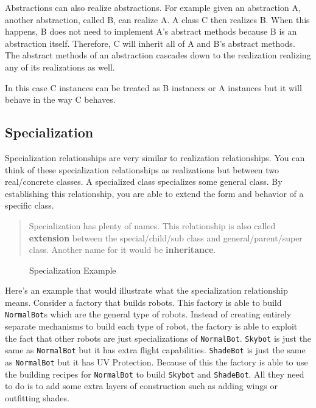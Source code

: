 Abstractions can also realize abstractions. For example given an
abstraction A, another abstraction, called B, can realize A. A class C
then realizes B. When this happens, B does not need to implement A's
abstract methods because B is an abstraction itself. Therefore, C will
inherit all of A and B's abstract methods. The abstract methods of an
abstraction cascades down to the realization realizing any of its
realizations as well.

In this case C instances can be treated as B instances or A instances
but it will behave in the way C behaves.

\subsection{Specialization}\label{class-relationships.md__specialization}

Specialization relationships are very similar to realization
relationships. You can think of these specialization relationships as
realizations but between two real/concrete classes. A specialized class
specializes some general class. By establishing this relationship, you
are able to extend the form and behavior of a specific class.

\begin{quote}
Specialization has plenty of names. This relationship is also called
\textbf{extension} between the special/child/sub class and
general/parent/super class. Another name for it would be
\textbf{inheritance}.
\end{quote}

\begin{figure}
\centering
{}
\caption{Specialization Example}
\end{figure}

Here's an example that would illustrate what the specialization
relationship means. Consider a factory that builds robots. This factory
is able to build \texttt{NormalBot}s which are the general type of
robots. Instead of creating entirely separate mechanisms to build each
type of robot, the factory is able to exploit the fact that other robots
are just specializations of \texttt{NormalBot}. \texttt{Skybot} is just
the same as \texttt{NormalBot} but it has extra flight capabilities.
\texttt{ShadeBot} is just the same as \texttt{NormalBot} but it has UV
Protection. Because of this the factory is able to use the building
recipes for \texttt{NormalBot} to build \texttt{Skybot} and
\texttt{ShadeBot}. All they need to do is to add some extra layers of
construction such as adding wings or outfitting shades.

